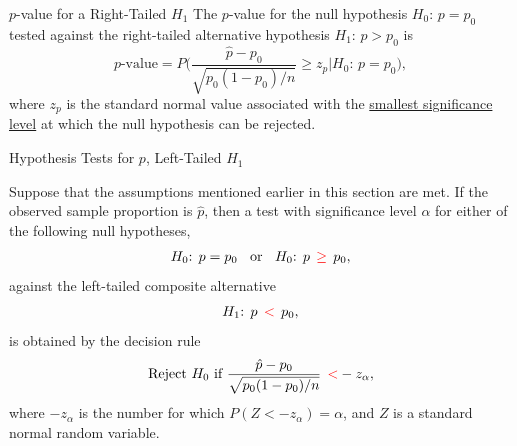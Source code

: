 \documentclass[pdf]{beamer}
\theoremstyle{remark}
\theoremstyle{definition}
\begin{document}
\begin{frame}[t]{$p$-value for a Right-Tailed $H_1$}
The $p$-value for the null hypothesis $H_0\text{: }  p = p_0$ tested against the right-tailed alternative hypothesis $H_1\text{: }  p > p_0$ is
\begin{equation}
p\text{-value} = P\bigg( \frac{\hat{p} - p_0}{\sqrt{p_0(1-p_0)/ n}} \geq z_{p} | H_0\text{: }  p = p_0 \bigg),
\end{equation}
where $z_p$ is the standard normal value associated with the \underline{smallest significance level} at which the null hypothesis can be rejected.
\end{frame}

\begin{frame}[t, label=pLT]{Hypothesis Tests for $p$, Left-Tailed $H_1$}
\small
\begin{tcolorbox}[colback=white!5,colframe=franklinblue]%
Suppose that the assumptions mentioned earlier in this section are met. If the observed sample proportion is $\hat{p}$, then a test with significance level $\alpha$ for either of the following null hypotheses, 
\vspace{-1.0ex}
\begin{align*} 
H_0\text{: }  p = p_0 \;\; \text{ or } \;\; H_0\text{: }  p \;\, \textcolor{red}{\geq} \;\, p_0, 
\end{align*} 
\vspace{-1.0ex}
against the left-tailed composite alternative 
\vspace{0.0ex}
\begin{align*} 
H_1\text{: }  p \;\, \textcolor{red}{<} \;\, p_0, 
\end{align*} 
\vspace{-1.0ex}
is obtained by the decision rule 
\vspace{0.0ex}
\begin{equation} 
\text{Reject } H_0 \text{ if } \frac{\hat{p} - p_0}{\sqrt{p_0(1-p_0)/ n}} \;\, \textcolor{red}{<}  -z_{\alpha},
\end{equation} 
where $-z_{\alpha}$ is the number for which $P(Z < -z_{\alpha}) = \alpha$, and $Z$ is a standard normal random variable. 
\end{tcolorbox}
\end{frame}
\end{document}
